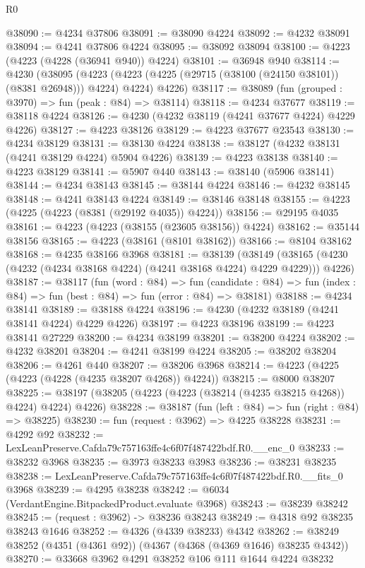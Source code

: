 \begin{lexlean}{R0}
\begin{coremodule}
@38090 := @4234 @37806
@38091 := @38090 @4224
@38092 := @4232 @38091
@38094 := @4241 @37806 @4224
@38095 := @38092 @38094
@38100 := @4223 (@4223 (@4228 (@36941 @940)) @4224)
@38101 := @36948 @940
@38114 := @4230
    (@38095
      (@4223 (@4223 (@4225 (@29715 (@38100 (@24150 @38101)) (@8381 @26948))) @4224) @4224)
      @4226)
@38117 := @38089 (fun (grouped : @3970) => fun (peak : @84) => @38114)
@38118 := @4234 @37677
@38119 := @38118 @4224
@38126 := @4230 (@4232 @38119 (@4241 @37677 @4224) @4229 @4226)
@38127 := @4223 @38126
@38129 := @4223 @37677 @23543
@38130 := @4234 @38129
@38131 := @38130 @4224
@38138 := @38127 (@4232 @38131 (@4241 @38129 @4224) @5904 @4226)
@38139 := @4223 @38138
@38140 := @4223 @38129
@38141 := @5907 @440
@38143 := @38140 (@5906 @38141)
@38144 := @4234 @38143
@38145 := @38144 @4224
@38146 := @4232 @38145
@38148 := @4241 @38143 @4224
@38149 := @38146 @38148
@38155 := @4223 (@4225 (@4223 (@8381 (@29192 @4035)) @4224))
@38156 := @29195 @4035
@38161 := @4223 (@4223 (@38155 (@23605 @38156)) @4224)
@38162 := @35144 @38156
@38165 := @4223 (@38161 (@8101 @38162))
@38166 := @8104 @38162
@38168 := @4235 @38166 @3968
@38181 := @38139
    (@38149 (@38165 (@4230 (@4232 (@4234 @38168 @4224) (@4241 @38168 @4224) @4229 @4229))) @4226)
@38187 := @38117
    (fun (word : @84) =>
    fun (candidate : @84) => fun (index : @84) => fun (best : @84) => fun (error : @84) => @38181)
@38188 := @4234 @38141
@38189 := @38188 @4224
@38196 := @4230 (@4232 @38189 (@4241 @38141 @4224) @4229 @4226)
@38197 := @4223 @38196
@38199 := @4223 @38141 @27229
@38200 := @4234 @38199
@38201 := @38200 @4224
@38202 := @4232 @38201
@38204 := @4241 @38199 @4224
@38205 := @38202 @38204
@38206 := @4261 @440
@38207 := @38206 @3968
@38214 := @4223 (@4225 (@4223 (@4228 (@4235 @38207 @4268)) @4224))
@38215 := @8000 @38207
@38225 := @38197 (@38205 (@4223 (@4223 (@38214 (@4235 @38215 @4268)) @4224) @4224) @4226)
@38228 := @38187 (fun (left : @84) => fun (right : @84) => @38225)
@38230 := fun (request : @3962) => @4225 @38228
@38231 := @4292 @92
@38232 := LexLeanPreserve.Cafda79c757163ffe4c6f07f487422bdf.R0.__enc_0
@38233 := @38232 @3968
@38235 := @3973 @38233 @3983
@38236 := @38231 @38235
@38238 := LexLeanPreserve.Cafda79c757163ffe4c6f07f487422bdf.R0.__fits_0 @3968
@38239 := @4295 @38238
@38242 := @6034 (VerdantEngine.BitpackedProduct.evaluate @3968)
@38243 := @38239 @38242
@38245 := (request : @3962) -> @38236 @38243
@38249 := @4318 @92 @38235 @38243 @1646
@38252 := @4326 (@4339 @38233) @4342
@38262 := @38249 @38252 (@4351 (@4361 @92)) (@4367 (@4368 (@4369 @1646) @38235 @4342))
@38270 := @33668 @3962 @4291 @38252 @106 @111 @1644 @4224 @38232

\end{coremodule}
\end{lexlean}
